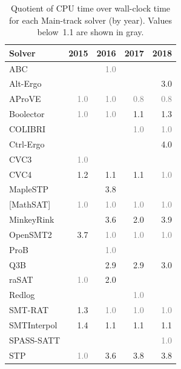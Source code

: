 \documentclass[dvipsnames,table,twoside,11pt]{article}
\begin{document}
\begin{table}
  \caption{Quotient of CPU time over wall-clock time for each
    Main-track solver (by year).  Values below~1.1 are shown in gray.}
  \label{table:parallelism}
  \centering
  \begin{tabular}{lrrrr}
    \toprule
    Solver & 2015 & 2016 & 2017 & 2018 \\
    \midrule
    ABC               &     & \textcolor{gray}{1.0} &     &     \\
    Alt-Ergo          &     &     &     & 3.0 \\
    AProVE            & \textcolor{gray}{1.0} & \textcolor{gray}{1.0} & \textcolor{gray}{0.8} & \textcolor{gray}{0.8} \\
    Boolector         & \textcolor{gray}{1.0} & \textcolor{gray}{1.0} & 1.1 & 1.3 \\
    COLIBRI           &     &     & \textcolor{gray}{1.0} & \textcolor{gray}{1.0} \\
    Ctrl-Ergo         &     &     &     & 4.0 \\
    CVC3              & \textcolor{gray}{1.0} &     &     &     \\
    CVC4              & 1.2 & 1.1 & 1.1 & \textcolor{gray}{1.0} \\
    MapleSTP          &     & 3.8 &     &     \\
    {[}MathSAT{]}     & \textcolor{gray}{1.0} & \textcolor{gray}{1.0} & \textcolor{gray}{1.0} & \textcolor{gray}{1.0} \\
    MinkeyRink        &     & 3.6 & 2.0 & 3.9 \\
    OpenSMT2          & 3.7 & \textcolor{gray}{1.0} & \textcolor{gray}{1.0} & \textcolor{gray}{1.0} \\
    ProB              &     & \textcolor{gray}{1.0} &     &     \\
    Q3B               &     & 2.9 & 2.9 & 3.0 \\
    raSAT             & \textcolor{gray}{1.0} & 2.0 &     &     \\
    Redlog            &     &     & \textcolor{gray}{1.0} &     \\
    SMT-RAT           & 1.3 & \textcolor{gray}{1.0} & \textcolor{gray}{1.0} & \textcolor{gray}{1.0} \\
    SMTInterpol       & 1.4 & 1.1 & 1.1 & 1.1 \\
    SPASS-SATT        &     &     &     & \textcolor{gray}{1.0} \\
    STP               & \textcolor{gray}{1.0} & 3.6 & 3.8 & 3.8 \\

\end{tabular}
\end{table}
\end{document}
